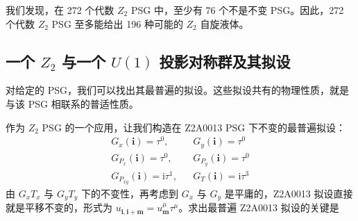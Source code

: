 我们发现，在 272 个代数 $Z_2$ PSG 中，至少有 76 个不是不变 PSG。因此，272 个代数 $Z_2$ PSG 至多能给出 196 种可能的 $Z_2$ 自旋液体。

\subsection{一个 $Z_2$ 与一个 $U(1)$ 投影对称群及其拟设}

\begin{keypoints}
\item 对给定的 PSG，我们可以找出其最普遍的拟设。这些拟设共有的物理性质，就是与该 PSG 相联系的普适性质。
\end{keypoints}

作为 $Z_2$ PSG 的一个应用，让我们构造在 Z2A0013 PSG 下不变的最普遍拟设：
\begin{equation*}
\begin{array}{rcl}
G_x(\pmb{i})=\tau^0, & & G_y(\pmb{i})=\tau^0\\[2pt]
G_{P_x}(\pmb{i})=\tau^0, & & G_{P_y}(\pmb{i})=\tau^0\\[2pt]
G_{P_{xy}}(\pmb{i})=\mathrm{i}\tau^1, & & G_T(\pmb{i})=\mathrm{i}\tau^3
\end{array}
\tag{9.4.18}
\end{equation*}
由 $G_xT_x$ 与 $G_yT_y$ 下的不变性，再考虑到 $G_x$ 与 $G_y$ 是平庸的，Z2A0013 拟设直接就是平移不变的，形式为 $u_{\pmb{i},\pmb{i}+\pmb{m}}=u_{\pmb{m}}^{\mu}\tau^{\mu}$。求出最普遍 Z2A0013 拟设的关键是



